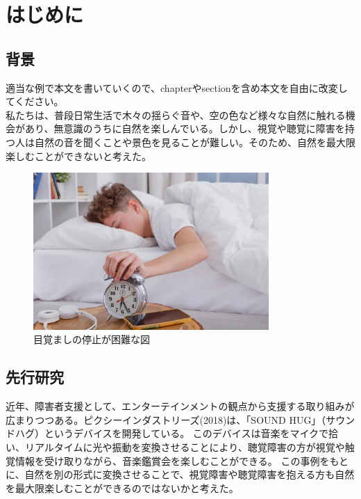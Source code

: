 \tableofcontents
\newpage

\pagestyle{fancy}
\fancyhf{}
\renewcommand{\headrulewidth}{0pt}
\makeatletter
\let\ps@plain\ps@fancy
\makeatother
\setlength{\headsep}{20pt}

\chapter{はじめに}
\section{背景}
適当な例で本文を書いていくので、chapterやsectionを含め本文を自由に改変してください。\\
\noindent\space
私たちは、普段日常生活で木々の揺らぐ音や、空の色など様々な自然に触れる機会があり、無意識のうちに自然を楽しんでいる。しかし、視覚や聴覚に障害を持つ人は自然の音を聞くことや景色を見ることが難しい。そのため、自然を最大限楽しむことができないと考えた。
\begin{figure}[h!]
  \centering
  \includegraphics[width=0.8\textwidth]{pages/report/images/alarm-stopping.jpeg}
  \caption{目覚ましの停止が困難な図}
  \label{fig:sample}
\end{figure}

\section{先行研究}
近年、障害者支援として、エンターテインメントの観点から支援する取り組みが広まりつつある。ピクシーインダストリーズ(2018)\cite{SOUNDHUG}は、「SOUND HUG」（サウンドハグ）というデバイスを開発している。
このデバイスは⾳楽をマイクで拾い、リアルタイムに光や振動を変換させることにより、聴覚障害の方が視覚や触覚情報を受け取りながら、音楽鑑賞会を楽しむことができる。
この事例をもとに、自然を別の形式に変換させることで、視覚障害や聴覚障害を抱える方も自然を最大限楽しむことができるのではないかと考えた。


